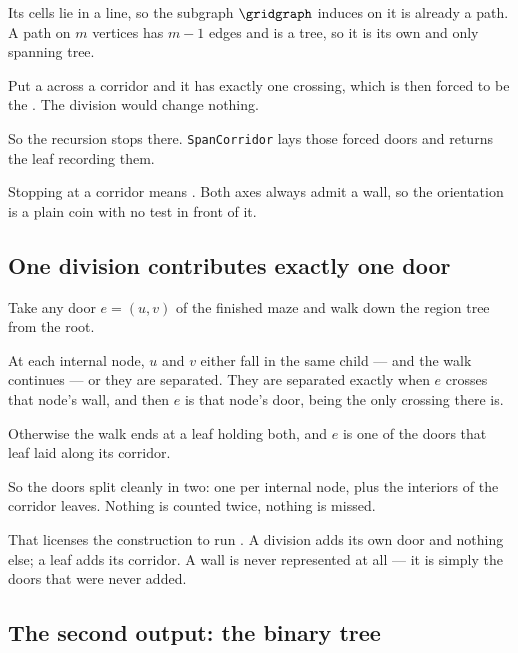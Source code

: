 Its cells lie in a line, so the subgraph $\gridgraph$ induces on it is already a
path. A path on $m$ vertices has $m-1$ edges and is a tree, so it is its own and
only spanning tree.

Put a  across a corridor and it has exactly one crossing, which
is then forced to be the . The division would change nothing.

So the recursion stops there. \texttt{SpanCorridor} lays those forced doors and
returns the leaf recording them.



\begin{keypoint}
Stopping at a corridor means . Both axes always admit a wall, so the orientation is a
plain coin with no test in front of it.
\end{keypoint}

\subsection{One division contributes exactly one door}
\label{sec:one-door-per-division}

Take any door $e=(u,v)$ of the finished maze and walk down the region tree from
the root.

At each internal node, $u$ and $v$ either fall in the same child --- and the
walk continues --- or they are separated. They are separated exactly when $e$
crosses that node's wall, and then $e$ is that node's door, being the only
crossing there is.

Otherwise the walk ends at a leaf holding both, and $e$ is one of the doors that
leaf laid along its corridor.

So the doors split cleanly in two: one per internal node, plus the interiors of
the corridor leaves. Nothing is counted twice, nothing is missed.

\begin{keypoint}
That licenses the construction to run . A division adds its
own door and nothing else; a leaf adds its corridor. A wall is never represented
at all --- it is simply the doors that were never added.
\end{keypoint}

\subsection{The second output: the binary tree}

